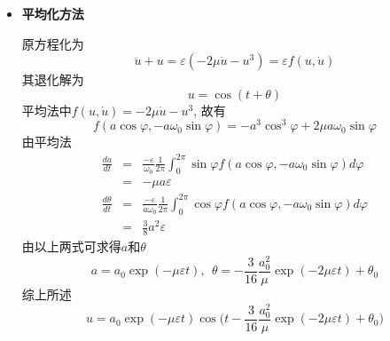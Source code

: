 \begin{solution}
\begin{itemize}
\item \textbf{平均化方法}

原方程化为
\[
\ddot{u}+ u = \varepsilon(-2\mu\dot{u}- u^3) = \varepsilon f(u, \dot{u})
\]
其退化解为
\[
u = \cos(t+\theta)
\]
平均法中$f(u, \dot{u}) = -2\mu\dot{u}- u^3$, 故有
\[
f(a\cos\varphi, -a\omega_0\sin\varphi) = -a^3\cos^3\varphi +2\mu a\omega_0\sin\varphi
\]
由平均法
\begin{eqnarray}
\frac{da}{dt} &=& \frac{-\varepsilon}{\omega_0}\frac{1}{2\pi}\int_0^{2\pi}\sin\varphi f(a\cos\varphi, -a\omega_0\sin\varphi) d\varphi\nonumber\\
&=& -\mu a\varepsilon\nonumber\\
\frac{d\theta}{dt} &=&\frac{-\varepsilon}{a\omega_0}\frac{1}{2\pi}\int_0^{2\pi}\cos\varphi f(a\cos\varphi, -a\omega_0\sin\varphi) d\varphi\nonumber\\
&=& \frac{3}{8}a^2\varepsilon
\end{eqnarray}
由以上两式可求得$a$和$\theta$
\[
a = a_0\exp(-\mu\varepsilon t), ~~ \theta = -\frac{3}{16}\frac{a_0^2}{\mu}\exp(-2\mu\varepsilon t) + \theta_0
\]
综上所述
\[
u = a_0\exp(-\mu\varepsilon t)\cos\Big(t-\frac{3}{16}\frac{a_0^2}{\mu}\exp(-2\mu\varepsilon t) + \theta_0\Big)
\]
\end{itemize}
\end{solution} 
